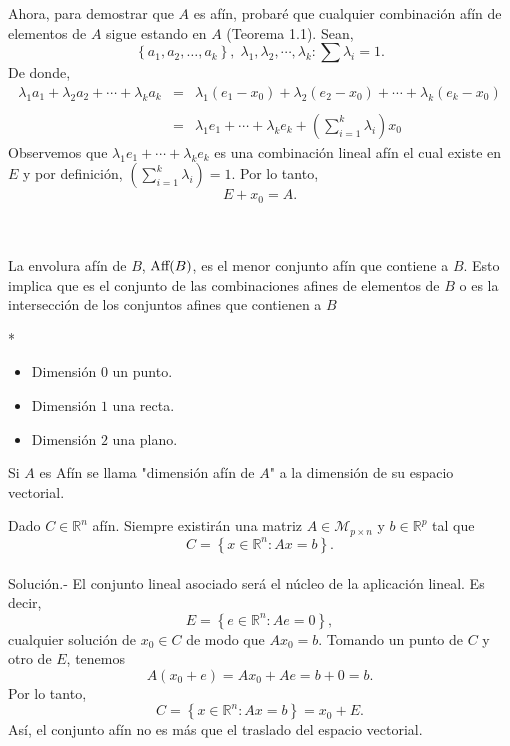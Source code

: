 \begin{paracol}{2}
\begin{teo}
	Ahora, para demostrar que $A$ es afín, probaré que cualquier combinación afín de elementos de $A$ sigue estando en $A$ (Teorema 1.1).
	Sean,
	$$\left\{a_1,a_2,\ldots,a_k\right\},\; \lambda_1,\lambda_2,\cdots,\lambda_k:\sum \lambda_i=1.$$
	De donde,
	$$
	\begin{array}{rcl}
	    \lambda_1a_1+\lambda_2a_2+\cdots+\lambda_ka_k&=&\lambda_1(e_1-x_0)+\lambda_2(e_2-x_0)+\cdots+\lambda_k(e_k-x_0)\\\\
							   &=& \lambda_1e_1+\cdots+\lambda_ke_k+\left(\displaystyle\sum_{i=1}^k \lambda_i\right)x_0
	\end{array}
	$$
	Observemos que $\lambda_1e_1+\cdots+\lambda_ke_k$ es una combinación lineal afín el cual existe en $E$ y por definición, $\left(\displaystyle\sum_{i=1}^k \lambda_i\right)=1$. Por lo tanto,
	$$E+x_0=A.$$
\end{teo}

\begin{def.}\,\\\\
    La envolura afín de $B$, $\mathop{\mbox{\normalfont Aff}}\nolimits(B)$, es el menor conjunto afín que contiene a $B$. Esto implica que es el conjunto de las combinaciones afines de elementos de $B$ o es la intersección de los conjuntos afines que contienen a $B$ 
\end{def.}

\switchcolumn[1]*{\noindent\scriptsize
\begin{itemize}
    \item Dimensión $0$ un punto.
    \item Dimensión $1$ una recta.
    \item Dimensión $2$ una plano.
\end{itemize}
}

\switchcolumn[0]

\begin{def.}
    Si $A$ es Afín se llama "dimensión afín de $A$" a la dimensión de su espacio vectorial.
\end{def.}

\begin{ejem}
    Dado $C\in \mathbb{R}^n$ afín. Siempre existirán una matriz $A\in \mathcal{M}_{p\times n}$ y $b\in \mathbb{R}^p$ tal que
    $$C=\left\{x\in \mathbb{R}^n:Ax=b\right\}.$$\\
	Solución.-\; El conjunto lineal asociado será el núcleo de la aplicación lineal. Es decir,
	$$E=\left\{e\in \mathbb{R}^n:Ae=0\right\},$$
	cualquier solución de $x_0\in C$ de modo que $Ax_0=b$. Tomando un punto de $C$ y otro de $E$, tenemos 
	$$A(x_0+e)=Ax_0+Ae=b+0=b.$$
	Por lo tanto,
	$$C=\left\{x\in \mathbb{R}^n:Ax=b\right\}=x_0+E.$$
	Así, el conjunto afín no es más que el traslado del espacio vectorial.
\end{ejem}


\end{paracol}
